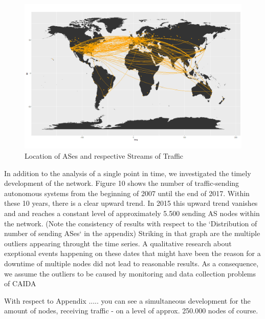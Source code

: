 \documentclass[conference, 11pt]{IEEEtran}
\begin{document}
\begin{figure}[htbp]
\centerline{\includegraphics[scale=0.2]{Graphics/connectedASes.png}}
\caption{Location of ASes and respective Streams of Traffic}
\label{fig}
\end{figure}

In addition to the analysis of a single point in time, we investigated the timely development of the network. Figure 10 shows the number of traffic-sending autonomous systems from the beginning of 2007 until the end of 2017. Within these 10 years, there is a clear upward trend. In 2015 this upward trend vanishes and and reaches a constant level of approximately 5.500 sending AS nodes within the network. (Note the consistency of results with respect to  the `Distribution of number of sending ASes` in the appendix) Striking in that graph are the multiple outliers appearing throught the time series. A qualitative research about exeptional events happening on these dates that might have been the reason for a downtime of multiple nodes did not lead to reasonable results. As a consequence, we assume the outliers to be caused by monitoring and data collection problems of CAIDA \cite{CaidaDataCollection}

With respect to Appendix .....  you can see a simultaneous development for the amount of nodes, receiving traffic - on a level of approx. 250.000 nodes of course. 
\end{document}
